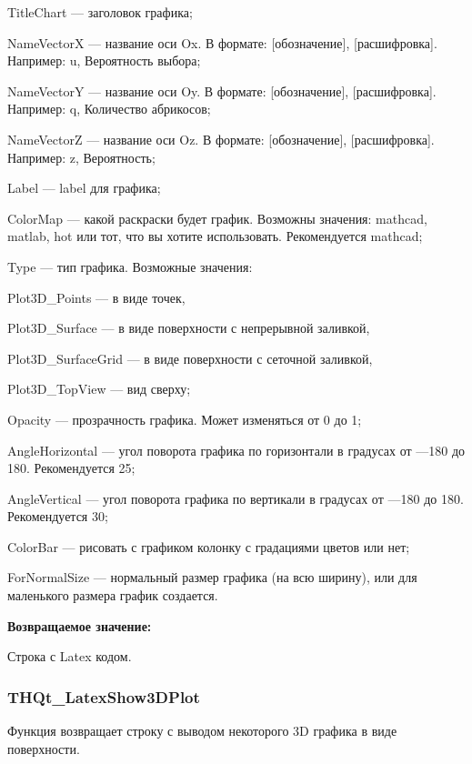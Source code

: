 \documentclass[a4paper,12pt]{article}
\begin{document}
    TitleChart --- заголовок графика;
 
    NameVectorX --- название оси Ox. В формате: [обозначение], [расшифровка]. Например: u, Вероятность выбора;
 
    NameVectorY --- название оси Oy. В формате: [обозначение], [расшифровка]. Например: q, Количество абрикосов;
 
    NameVectorZ --- название оси Oz. В формате: [обозначение], [расшифровка]. Например: z, Вероятность;
 
    Label --- label для графика;
 
    ColorMap --- какой раскраски будет график. Возможны значения: mathcad, matlab, hot или тот, что вы хотите использовать. Рекомендуется mathcad;
 
    Type --- тип графика. Возможные значения:
 
       Plot3D\_Points --- в виде точек,
 
       Plot3D\_Surface --- в виде поверхности с непрерывной заливкой,
 
       Plot3D\_SurfaceGrid --- в виде поверхности с сеточной заливкой,
 
       Plot3D\_TopView --- вид сверху;
 
    Opacity --- прозрачность графика. Может изменяться от 0 до 1;
 
    AngleHorizontal --- угол поворота графика по горизонтали в градусах от ---180 до 180. Рекомендуется 25;
 
    AngleVertical --- угол поворота графика по вертикали в градусах от ---180 до 180. Рекомендуется 30;
 
    ColorBar --- рисовать с графиком колонку с градациями цветов или нет;
 
    ForNormalSize --- нормальный размер графика (на всю ширину), или для маленького размера график создается.

\textbf{Возвращаемое значение:}

Строка с Latex кодом.


\subsubsection{THQt\_LatexShow3DPlot}\label{THQt_LatexShow3DPlot}

Функция возвращает строку с выводом некоторого 3D графика в виде поверхности.
\end{document}
